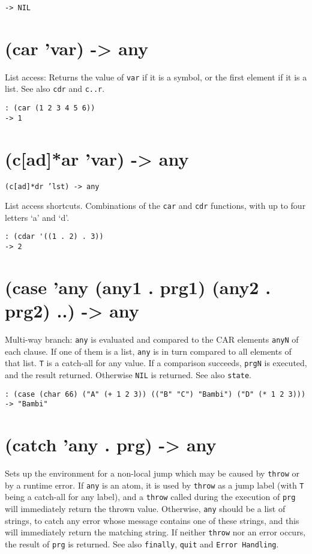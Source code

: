 {\begin{verbatim}
-> NIL
\end{verbatim}

 
\section{(car 'var) -> any}
\label{sec-8-1-3-6}


List access: Returns the value of \texttt{var} if it is a symbol, or the first
element if it is a list. See also \texttt{cdr} and \texttt{c..r}.


\begin{verbatim}
: (car (1 2 3 4 5 6))
-> 1
\end{verbatim}

 
\section{(c[ad]*ar 'var) -> any}
\label{sec-8-1-3-7}


\texttt{(c[ad]*dr 'lst) -> any}

List access shortcuts. Combinations of the \texttt{car} and \texttt{cdr} functions,
with up to four letters `a' and `d'.


\begin{verbatim}
: (cdar '((1 . 2) . 3))
-> 2
\end{verbatim}

 
\section{(case 'any (any1 . prg1) (any2 . prg2) ..) -> any}
\label{sec-8-1-3-8}


Multi-way branch: \texttt{any} is evaluated and compared to the CAR elements
\texttt{anyN} of each clause. If one of them is a list, \texttt{any} is in turn
compared to all elements of that list. \texttt{T} is a catch-all for any value.
If a comparison succeeds, \texttt{prgN} is executed, and the result returned.
Otherwise \texttt{NIL} is returned. See also \texttt{state}.


\begin{verbatim}
: (case (char 66) ("A" (+ 1 2 3)) (("B" "C") "Bambi") ("D" (* 1 2 3)))
-> "Bambi"
\end{verbatim}

 
\section{(catch 'any . prg) -> any}
\label{sec-8-1-3-9}


Sets up the environment for a non-local jump which may be caused by
\texttt{throw} or by a runtime error. If \texttt{any} is an atom, it is used by
\texttt{throw} as a jump label (with \texttt{T} being a catch-all for any label), and
a \texttt{throw} called during the execution of \texttt{prg} will immediately return
the thrown value. Otherwise, \texttt{any} should be a list of strings, to catch
any error whose message contains one of these strings, and this will
immediately return the matching string. If neither \texttt{throw} nor an error
occurs, the result of \texttt{prg} is returned. See also \texttt{finally}, \texttt{quit} and
\texttt{Error Handling}.


}
